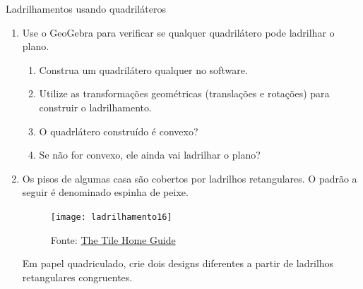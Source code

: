 \begin{task}{Ladrilhamentos usando quadriláteros}
\begin{enumerate}
\begin{figure}[H]
\end{figure}

\begin{enumerate}
	\item A figura abaixo ilustra um padrão parcial feito com esse trapézio, em um hexágono regular (e como o hexágono pavimenta o plano, basta repetir o padrão hexagonal). Construa outro padrão no hexágono usando apenas trapézios 60-120.

	\begin{figure}[H]
	\centering
	\texttt{[image: ladrilhamento49]}

	\end{figure}

	\item Com o trapézio 60-120 também é possível construir padrões do tipo "faixas decorativas". Faça um padrão diferente do apresentado usando trapézios 60-120.

	\begin{figure}[H]
	\centering
	\texttt{[image: ladrilhamento50]}

	\end{figure}
\end{enumerate}


\item Use o GeoGebra para verificar se qualquer quadrilátero pode ladrilhar o plano.
\begin{enumerate}
	\item Construa um quadrilátero qualquer no software.
	\item Utilize as transformações geométricas (translações e rotações) para construir o ladrilhamento.
	\item O quadrlátero construído é convexo?
	\item Se não for convexo, ele ainda vai ladrilhar o plano?
\end{enumerate}

\item Os pisos de algumas casa são cobertos por ladrilhos retangulares. O padrão a seguir é denominado espinha de peixe. 

	\begin{figure}[H]
	\centering
	\texttt{[image: ladrilhamento16]}

	\caption{Fonte: \href{http://www.tilehomeguide.com/tile-patterns-the-ultimate-quick-read-beginners-guide-including-secrets-of-tile-professionals-revealed/}{The Tile Home Guide}}
	\end{figure}

 Em papel quadriculado, crie dois designs diferentes a partir de ladrilhos retangulares congruentes.
\end{enumerate}

\end{task}

